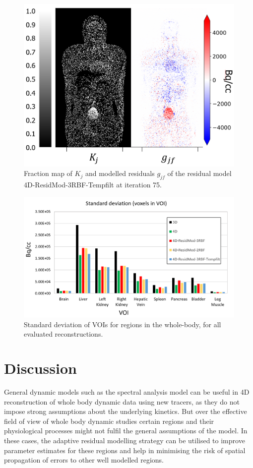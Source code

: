 \begin{figure} [!htbp]
\centering
\includegraphics[scale=0.44 ,angle=0]{3_Results/3_4_Residual/figures/FractionMap.png}
\caption{Fraction map of $K_j$ and modelled residuals $g_{jf}$ of the residual model 4D-ResidMod-3RBF-Tempfilt at iteration 75.} 
\label{fig:FractionMap}
\end{figure}

\begin{figure} [!htbp]
\centering
\includegraphics[scale=0.65 ,angle=0]{3_Results/3_4_Residual/figures/BarPlot.png}
\caption{Standard deviation of VOIs for regions in the whole-body, for all evaluated reconstructions.} 
\label{fig:BarPlot}
\end{figure}

\section{Discussion}
General dynamic models such as the spectral analysis model can be useful in 4D reconstruction of whole body dynamic data using new tracers, as they do not impose strong assumptions about the underlying kinetics. But over the effective field of view of whole body dynamic studies certain regions and their physiological processes might not fulfil the general assumptions of the model. In these cases, the adaptive residual modelling strategy can be utilised to improve parameter estimates for these regions and help in minimising the risk of spatial propagation of errors to other well modelled regions.

